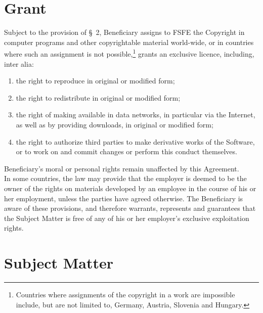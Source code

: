 \section{Grant}
\A Subject to the provision of {\S}~2, Beneficiary assigns to FSFE the
Copyright in computer programs and other copyrightable material
world-wide, or in countries where such an assignment is not
possible,\footnote{Countries where assignments of the copyright in a
work are impossible include, but are not limited to, Germany, Austria,
Slovenia and Hungary.} grants an exclusive licence, including, inter
alia:
\begin{enumerate}
\item the right to reproduce in original or modified form;
\item the right to redistribute in original or modified form;
\item the right of making available in data networks, in particular
  via the Internet, as well as by providing downloads, in original or
  modified form;
\item the right to authorize third parties to make derivative works of
  the Software, or to work on and commit changes or perform this
  conduct themselves.
\end{enumerate}
\A Beneficiary's moral or personal rights remain unaffected by this
Agreement.\\ 
\A In some countries, the law may provide that the employer is deemed
to be the owner of the rights on materials developed by an employee in
the course of his or her employment, unless the parties have agreed
otherwise. The Beneficiary is aware of these provisions, and therefore
warrants, represents and guarantees that the Subject Matter is free of
any of his or her employer's exclusive exploitation rights.

\section{Subject Matter}

